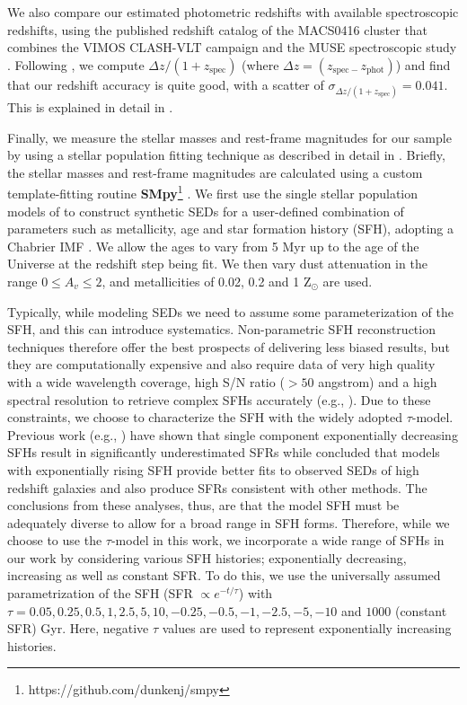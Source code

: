 \documentclass[twocolumn]{aastex63}
\begin{document}
We also compare our estimated photometric redshifts with available spectroscopic redshifts, using the published redshift catalog of the MACS0416 cluster that combines the VIMOS CLASH-VLT campaign \citep{Balestra2016} and the MUSE spectroscopic study \citet{Caminha2017}. Following \citet{Dahlen2013}, we compute $\Delta z/(1+z_{\mathrm{spec}})$ (where $\Delta z=(z_{\mathrm{spec}-}z_{\mathrm{phot}})$) and find that our redshift accuracy is quite good, with a scatter of $\sigma_{\Delta z/(1+z_{\mathrm{spec}})}=0.041$. This is explained in detail in \citet{Bhatawdekar2019}.

Finally, we measure the stellar masses and rest-frame magnitudes for our sample by using a stellar population fitting technique as described in detail in \citet{Bhatawdekar2019}. Briefly, the stellar masses and rest-frame magnitudes are calculated using a custom template-fitting routine \textbf{SMpy}\footnote[6]{https://github.com/dunkenj/smpy} \citep{Duncan2014}. We first use the single stellar population models of \citet{Bruzual2003} to construct synthetic SEDs for a user-defined combination of parameters such as metallicity, age and star formation history (SFH), adopting a Chabrier IMF \citep{chabrier2003}. We allow the ages to vary from 5 Myr up to the age of the Universe at the redshift step being fit. We then vary dust attenuation in the range $0\leq A_{v}\leq2$, and metallicities of 0.02, 0.2 and 1 Z$_{\odot}$ are used. 

Typically, while modeling SEDs we need to assume some parameterization of the SFH, and this can introduce systematics. Non-parametric SFH reconstruction techniques therefore offer the best prospects of delivering less biased results, but they are computationally expensive and also require data of very high quality with a wide wavelength coverage, high S/N ratio ($>50$ angstrom) and a high spectral resolution to retrieve complex SFHs accurately (e.g., \citealt{Ocvirk2006,Tojeiro2007}). Due to these constraints, we choose to characterize the SFH with the widely adopted $\tau$-model. Previous work (e.g., \citealt{Lee2009}) have shown that single component exponentially decreasing SFHs result in significantly underestimated SFRs while \citet{Maraston2010} concluded that models with exponentially rising SFH provide better fits to observed SEDs of high redshift galaxies and also produce SFRs consistent with other methods. The conclusions from these analyses, thus, are that the model SFH must be adequately diverse to allow for a broad range in SFH forms. Therefore, while we choose to use the $\tau$-model in this work, we incorporate a wide range of SFHs in our work by considering various SFH histories; exponentially decreasing, increasing as well as constant SFR. To do this, we use the  universally assumed parametrization of the SFH (SFR $\propto e^{-t/\tau}$) with $\tau=0.05,0.25,0.5,1,2.5,5,10,-0.25,-0.5,-1,-2.5,-5,-10$ and $1000$ (constant SFR) Gyr. Here, negative $\tau$ values are used to represent exponentially increasing histories. 
\end{document}
